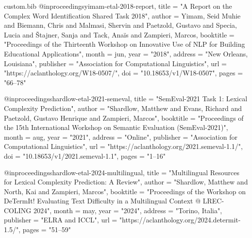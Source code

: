 
\begin{filecontents*}[overwrite]{custom.bib}
@inproceedings{yimam-etal-2018-report,
    title = "A Report on the Complex Word Identification Shared Task 2018",
    author = {Yimam, Seid Muhie  and
      Biemann, Chris  and
      Malmasi, Shervin  and
      Paetzold, Gustavo  and
      Specia, Lucia  and
      {\v{S}}tajner, Sanja  and
      Tack, Ana{\"i}s  and
      Zampieri, Marcos},
    booktitle = "Proceedings of the Thirteenth Workshop on Innovative Use of {NLP} for Building Educational Applications",
    month = jun,
    year = "2018",
    address = "New Orleans, Louisiana",
    publisher = "Association for Computational Linguistics",
    url = "https://aclanthology.org/W18-0507/",
    doi = "10.18653/v1/W18-0507",
    pages = "66--78"
}

@inproceedings{shardlow-etal-2021-semeval,
    title = "{S}em{E}val-2021 Task 1: Lexical Complexity Prediction",
    author = "Shardlow, Matthew  and
      Evans, Richard  and
      Paetzold, Gustavo Henrique  and
      Zampieri, Marcos",
    booktitle = "Proceedings of the 15th International Workshop on Semantic Evaluation (SemEval-2021)",
    month = aug,
    year = "2021",
    address = "Online",
    publisher = "Association for Computational Linguistics",
    url = "https://aclanthology.org/2021.semeval-1.1/",
    doi = "10.18653/v1/2021.semeval-1.1",
    pages = "1--16"
}

@inproceedings{shardlow-etal-2024-multilingual,
    title = "Multilingual Resources for Lexical Complexity Prediction: A Review",
    author = "Shardlow, Matthew  and
      North, Kai  and
      Zampieri, Marcos",
    booktitle = "Proceedings of the Workshop on DeTermIt! Evaluating Text Difficulty in a Multilingual Context @ LREC-COLING 2024",
    month = may,
    year = "2024",
    address = "Torino, Italia",
    publisher = "ELRA and ICCL",
    url = "https://aclanthology.org/2024.determit-1.5/",
    pages = "51--59"
}


\end{filecontents*}
